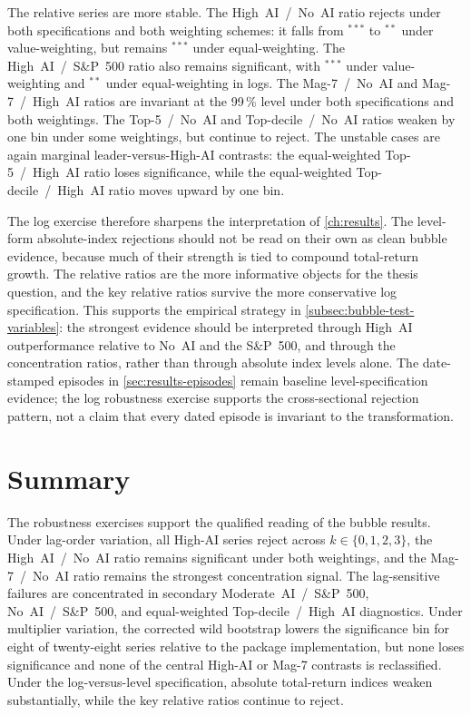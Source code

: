 The relative series are more stable. The High~AI~/~No~AI ratio rejects under both specifications and both weighting schemes: it falls from $^{***}$ to $^{**}$ under value-weighting, but remains $^{***}$ under equal-weighting. The High~AI~/~S\&P~500 ratio also remains significant, with $^{***}$ under value-weighting and $^{**}$ under equal-weighting in logs. The Mag-7~/~No~AI and Mag-7~/~High~AI ratios are invariant at the 99\,\% level under both specifications and both weightings. The Top-5~/~No~AI and Top-decile~/~No~AI ratios weaken by one bin under some weightings, but continue to reject. The unstable cases are again marginal leader-versus-High-AI contrasts: the equal-weighted Top-5~/~High~AI ratio loses significance, while the equal-weighted Top-decile~/~High~AI ratio moves upward by one bin.

The log exercise therefore sharpens the interpretation of \cref{ch:results}. The level-form absolute-index rejections should not be read on their own as clean bubble evidence, because much of their strength is tied to compound total-return growth. The relative ratios are the more informative objects for the thesis question, and the key relative ratios survive the more conservative log specification. This supports the empirical strategy in \cref{subsec:bubble-test-variables}: the strongest evidence should be interpreted through High~AI outperformance relative to No~AI and the S\&P~500, and through the concentration ratios, rather than through absolute index levels alone. The date-stamped episodes in \cref{sec:results-episodes} remain baseline level-specification evidence; the log robustness exercise supports the cross-sectional rejection pattern, not a claim that every dated episode is invariant to the transformation.


\section{Summary}
\label{sec:rob-psy}

The robustness exercises support the qualified reading of the bubble results. Under lag-order variation, all High-AI series reject across $k\in\{0,1,2,3\}$, the High~AI~/~No~AI ratio remains significant under both weightings, and the Mag-7~/~No~AI ratio remains the strongest concentration signal. The lag-sensitive failures are concentrated in secondary Moderate~AI~/~S\&P~500, No~AI~/~S\&P~500, and equal-weighted Top-decile~/~High~AI diagnostics. Under multiplier variation, the corrected wild bootstrap lowers the significance bin for eight of twenty-eight series relative to the package implementation, but none loses significance and none of the central High-AI or Mag-7 contrasts is reclassified. Under the log-versus-level specification, absolute total-return indices weaken substantially, while the key relative ratios continue to reject.

